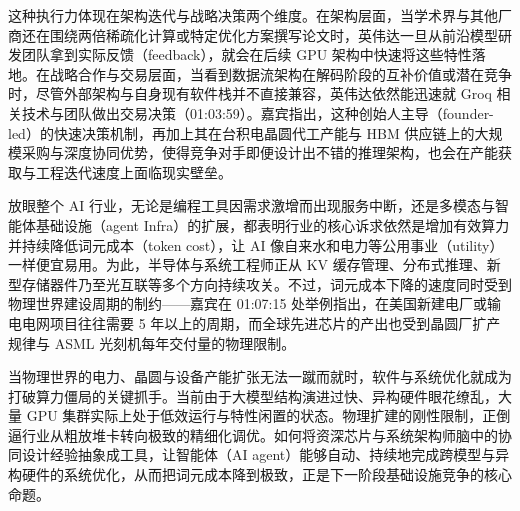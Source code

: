 \documentclass[UTF8,a4paper,11pt,fontset=fandol]{ctexart}
\begin{document}
这种执行力体现在架构迭代与战略决策两个维度。在架构层面，当学术界与其他厂商还在围绕两倍稀疏化计算或特定优化方案撰写论文时，英伟达一旦从前沿模型研发团队拿到实际反馈（feedback），就会在后续 GPU 架构中快速将这些特性落地。在战略合作与交易层面，当看到数据流架构在解码阶段的互补价值或潜在竞争时，尽管外部架构与自身现有软件栈并不直接兼容，英伟达依然能迅速就 Groq 相关技术与团队做出交易决策（01:03:59）。嘉宾指出，这种创始人主导（founder-led）的快速决策机制，再加上其在台积电晶圆代工产能与 HBM 供应链上的大规模采购与深度协同优势，使得竞争对手即便设计出不错的推理架构，也会在产能获取与工程迭代速度上面临现实壁垒。

放眼整个 AI 行业，无论是编程工具因需求激增而出现服务中断，还是多模态与智能体基础设施（agent Infra）的扩展，都表明行业的核心诉求依然是增加有效算力并持续降低词元成本（token cost），让 AI 像自来水和电力等公用事业（utility）一样便宜易用。为此，半导体与系统工程师正从 KV 缓存管理、分布式推理、新型存储器件乃至光互联等多个方向持续攻关。不过，词元成本下降的速度同时受到物理世界建设周期的制约——嘉宾在 01:07:15 处举例指出，在美国新建电厂或输电电网项目往往需要 5 年以上的周期，而全球先进芯片的产出也受到晶圆厂扩产规律与 ASML 光刻机每年交付量的物理限制。

当物理世界的电力、晶圆与设备产能扩张无法一蹴而就时，软件与系统优化就成为打破算力僵局的关键抓手。当前由于大模型结构演进过快、异构硬件眼花缭乱，大量 GPU 集群实际上处于低效运行与特性闲置的状态。物理扩建的刚性限制，正倒逼行业从粗放堆卡转向极致的精细化调优。如何将资深芯片与系统架构师脑中的协同设计经验抽象成工具，让智能体（AI agent）能够自动、持续地完成跨模型与异构硬件的系统优化，从而把词元成本降到极致，正是下一阶段基础设施竞争的核心命题。
\end{document}
